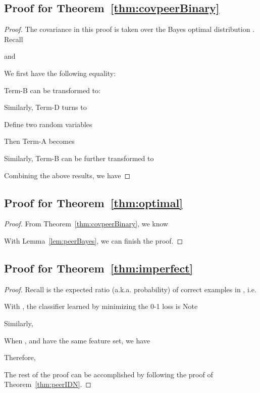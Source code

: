 \documentclass[final]{cvpr}
\newcommand{\covpeer}{\text{CAL}}
\begin{document}
\subsection{Proof for Theorem~\ref{thm:covpeerBinary}}\label{proof:covpeerBinary}
\begin{proof}


The covariance  in this proof is taken over the Bayes optimal distribution .
Recall 

and 

We first have the following equality:

Term-B can be transformed to:

Similarly, Term-D turns to

Define two random variables

Then Term-A becomes

Similarly, Term-B can be further transformed to

Combining the above results, we have

\end{proof}


\subsection{Proof for Theorem~\ref{thm:optimal}}\label{proof:optimal}






\begin{proof}
From Theorem~\ref{thm:covpeerBinary}, we know

With Lemma~\ref{lem:peerBayes}, we can finish the proof.
\end{proof}

\subsection{Proof for Theorem~\ref{thm:imperfect}}\label{proof:imperfect}
\begin{proof}


Recall  is the expected ratio (a.k.a. probability) of correct examples in , i.e.

With , the classifier learned by minimizing the 0-1 \covpeer{} loss is 
{
}
Note

Similarly,

When ,  and  have the same feature set, we have

Therefore, 

The rest of the proof can be accomplished by following the proof of Theorem~\ref{thm:peerIDN}.
\end{proof}
\end{document}
